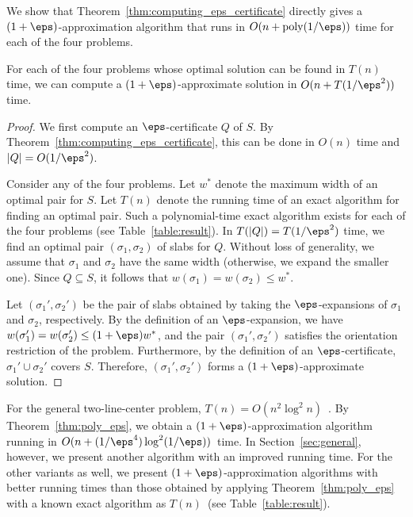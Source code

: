 
We show that Theorem~\ref{thm:computing_eps_certificate} directly gives a $(1+\eps)$-approximation algorithm that runs in $O(n + \mathrm{poly}(1/\eps))$ time for each of the four problems. 


\begin{theorem}
    \label{thm:poly_eps}
    For each of the four problems whose optimal solution can be found in $T(n)$ time, 
    we can compute a $(1+\eps)$-approximate solution in $O(n + T(1/\eps^2))$ time.
\end{theorem}

\begin{proof}
    
We first compute an $\eps$-certificate $Q$ of $S$. 
By Theorem~\ref{thm:computing_eps_certificate}, this can be done in $O(n)$ time and $|Q| = O(1/\eps^2)$.

Consider any of the four problems.
Let $w^*$ denote the maximum width of an optimal pair for $S$.  
Let $T(n)$ denote the running time of an exact algorithm for finding an optimal pair.
Such a polynomial-time exact algorithm exists for each of the four problems (see Table~\ref{table:result}).  
In $T(|Q|) = T(1/\eps^2)$ time, we find an optimal pair $(\sigma_1, \sigma_2)$ of slabs for $Q$.  
Without loss of generality, we assume that $\sigma_1$ and $\sigma_2$ have the same width (otherwise, we expand the smaller one).  
Since $Q \subseteq S$, it follows that $w(\sigma_1) = w(\sigma_2) \le w^*$.

Let $(\sigma_1', \sigma_2')$ be the pair of slabs obtained by taking the $\eps$-expansions of $\sigma_1$ and $\sigma_2$, respectively.  
By the definition of an $\eps$-expansion, we have $w(\sigma_1') = w(\sigma_2') \le (1+\eps)w^*$, and the pair $(\sigma_1', \sigma_2')$ satisfies the orientation restriction of the problem.  
Furthermore, by the definition of an $\eps$-certificate, $\sigma_1' \cup \sigma_2'$ covers $S$.  
Therefore, $(\sigma_1', \sigma_2')$ forms a $(1+\eps)$-approximate solution.
\end{proof}


For the general two-line-center problem, 
$T(n) = O(n^2 \log^2 n)$~\cite{jaromczyk1995}.
By Theorem~\ref{thm:poly_eps}, we obtain a $(1+\eps)$-approximation algorithm running in 
$O(n + (1/\eps^4) \log^2 (1/\eps))$~time. 
In Section~\ref{sec:general}, however, we present another algorithm with an improved running time. 
For the other variants as well, we present $(1+\eps)$-approximation algorithms with better running times than those obtained by applying Theorem~\ref{thm:poly_eps} with a known exact algorithm as $T(n)$~(see Table~\ref{table:result}).



